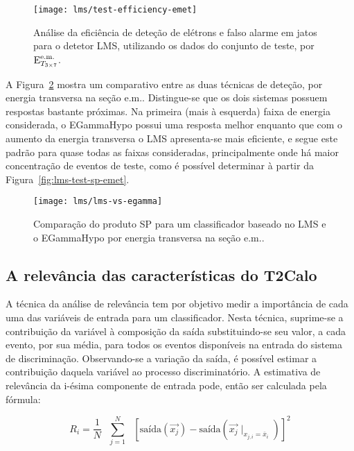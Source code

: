\begin{figure}
\begin{center}
\texttt{[image: lms/test-efficiency-emet]}
\end{center}
\caption{Análise da eficiência de deteção de elétrons e falso alarme em jatos
para o detetor LMS, utilizando os dados do conjunto de teste, por $\text{E}^{\text{e.m.}}_{T_{3\times7}}$.}
\label{fig:lms-test-efficiency-emet}
\end{figure}

A Figura~\ref{fig:lms-vs-egamma} mostra um comparativo entre as duas técnicas
de deteção, por energia transversa na seção e.m.. Distingue-se que os dois
sistemas possuem respostas bastante próximas. Na primeira (mais à esquerda)
faixa de energia considerada, o EGammaHypo possui uma resposta melhor enquanto
que com o aumento da energia transversa o LMS apresenta-se mais eficiente, e
segue este padrão para quase todas as faixas consideradas, principalmente onde
há maior concentração de eventos de teste, como é possível determinar à partir
da Figura~\ref{fig:lms-test-sp-emet}.

\begin{figure}
\begin{center}
\texttt{[image: lms/lms-vs-egamma]}
\end{center}
\caption{Comparação do produto SP para um classificador baseado no LMS e o
EGammaHypo por energia transversa na seção e.m..}
\label{fig:lms-vs-egamma}
\end{figure}

\subsection{A relevância das características do T2Calo}

A técnica da análise de relevância \cite{relevance} tem por objetivo medir a
importância de cada uma das variáveis de entrada para um classificador. Nesta
técnica, suprime-se a contribuição da variável à composição da saída
substituindo-se seu valor, a cada evento, por sua média, para todos os eventos
disponíveis na entrada do sistema de discriminação. Observando-se a variação
da saída, é possível estimar a contribuição daquela variável ao processo
discriminatório. A estimativa de relevância da i-ésima componente de entrada
pode, então ser calculada pela fórmula:

\begin{equation}
R_i = \frac{1}{N} \text{ } \overset{N}{\underset{j=1}{\sum}} \text{ }
[\text{saída}(\overrightarrow{x_j}) -
\text{saída}(\overrightarrow{x_j}\mid_{x_{j,i} = \overline{x}_i})]^2 
\label{eq:relevance-mse}
\end{equation}


